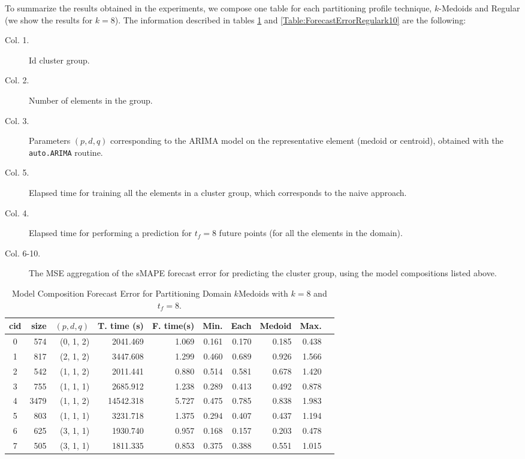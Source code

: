To summarize the results obtained in the experiments, we compose one table for each partitioning profile technique, $k$-Medoids and Regular (we show the results for $k=8$). The information described in tables \ref{Table:ForecastErrorkMedoidsk8} and \ref{Table:ForecastErrorRegulark10} are the following:

\begin{description}
    \item[Col. 1.] Id cluster group.
    \item[Col. 2.] Number of elements in the group.
    \item[Col. 3.] Parameters $(p, d, q)$ corresponding to the ARIMA model on the representative element (medoid or centroid), obtained with the \texttt{auto.ARIMA} routine.
    \item[Col. 5.] Elapsed time for training all the elements in a cluster group, which corresponds to the naive approach.
    \item[Col. 4.] Elapsed time for performing a prediction for $t_{f}=8$ future points (for all the elements in the domain).
    \item[Col. 6-10.] The MSE aggregation of the sMAPE forecast error for predicting the cluster group, using the model compositions listed above.
\end{description}

\begin{table}[h]
	\centering
	\small
	\begin{tabular}{|c|r|r|r|r|r|r|r|r|r|}
        \hline
        cid & size & $(p, d, q)$ & T. time (s) & F. time(s) & Min. & Each & \cellcolor{red!20}Medoid & Max. \\
        \hline
        0 &  574 & (0, 1, 2) &  2041.469   & 1.069   & 0.161  & 0.170  & \cellcolor{red!20}0.185 & 0.438  \\
        1 &  817 & (2, 1, 2) &  3447.608   & 1.299   & 0.460  & 0.689  & \cellcolor{red!20}0.926 & 1.566  \\
        2 &  542 & (1, 1, 2) &  2011.441   & 0.880   & 0.514  & 0.581  & \cellcolor{red!20}0.678 & 1.420  \\
        3 &  755 & (1, 1, 1) &  2685.912   & 1.238   & 0.289  & 0.413  & \cellcolor{red!20}0.492 & 0.878  \\
        4 & 3479 & (1, 1, 2) & 14542.318   & 5.727   & 0.475  & 0.785  & \cellcolor{red!20}0.838 & 1.983  \\
        5 &  803 & (1, 1, 1) &  3231.718   & 1.375   & 0.294  & 0.407  & \cellcolor{red!20}0.437 & 1.194  \\
        6 &  625 & (3, 1, 1) &  1930.740   & 0.957   & 0.168  & 0.157  & \cellcolor{red!20}0.203 & 0.478  \\
        7 &  505 & (3, 1, 1) &  1811.335   & 0.853   & 0.375  & 0.388  & \cellcolor{red!20}0.551 & 1.015  \\ \hline      
	\end{tabular}
	\caption{Model Composition Forecast Error for Partitioning Domain $k$Medoids with $k=8$ and $t_{f}=8$.}
	\label{Table:ForecastErrorkMedoidsk8}
\end{table}

